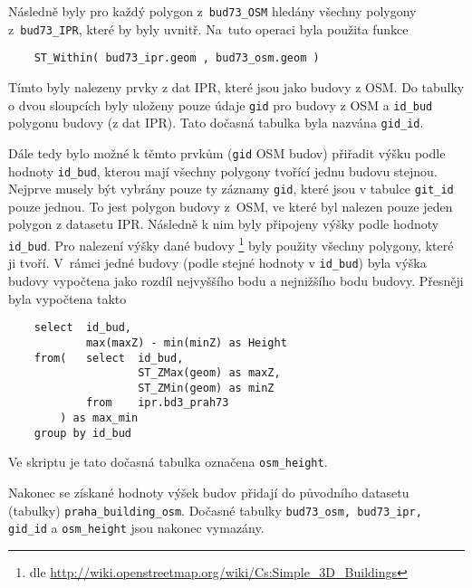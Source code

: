 Následně byly pro každý polygon z~{\tt bud73\_OSM} hledány
všechny polygony z~{\tt bud73\_IPR}, které by byly uvnitř.
Na~tuto operaci byla použita funkce
\begin{verbatim}
    ST_Within( bud73_ipr.geom , bud73_osm.geom )
\end{verbatim}
Tímto byly nalezeny prvky z dat IPR, které jsou  jako budovy z OSM. Do tabulky o dvou sloupcích byly
uloženy pouze údaje {\tt gid} pro budovy z OSM a {\tt id\_bud}
polygonu budovy (z dat IPR). Tato dočasná tabulka byla nazvána {\tt gid\_id}.

Dále tedy bylo možné k těmto prvkům ({\tt gid} OSM budov) přiřadit
výšku podle hodnoty {\tt id\_bud}, kterou mají všechny polygony
tvořící jednu budovu stejnou. Nejprve musely být vybrány pouze ty
záznamy {\tt gid}, které jsou v tabulce {\tt git\_id} pouze jednou.
To jest polygon budovy z~OSM, ve které byl nalezen pouze jeden polygon
z datasetu IPR. Následně k nim byly připojeny výšky podle hodnoty
{\tt id\_bud}. Pro nalezení výšky dané budovy \footnote{dle \url{http://wiki.openstreetmap.org/wiki/Cs:Simple_3D_Buildings}}
byly použity všechny polygony, které ji tvoří. V~rámci jedné budovy
(podle stejné hodnoty v {\tt id\_bud}) byla výška budovy vypočtena
jako rozdíl nejvyššího bodu a nejnižšího bodu budovy.
Přesněji byla vypočtena takto
\begin{verbatim}
    select	id_bud,
            max(maxZ) - min(minZ) as Height
    from(   select	id_bud,
                    ST_ZMax(geom) as maxZ,
                    ST_ZMin(geom) as minZ
            from    ipr.bd3_prah73
        ) as max_min
    group by id_bud
\end{verbatim}
Ve skriptu je tato dočasná tabulka označena {\tt osm\_height}.

Nakonec se získané hodnoty výšek budov přidají do původního datasetu
(tabulky) {\tt praha\_building\_osm}. 
Dočasné tabulky {\tt bud73\_osm, bud73\_ipr, gid\_id} a
{\tt osm\_height} jsou nakonec vymazány.
